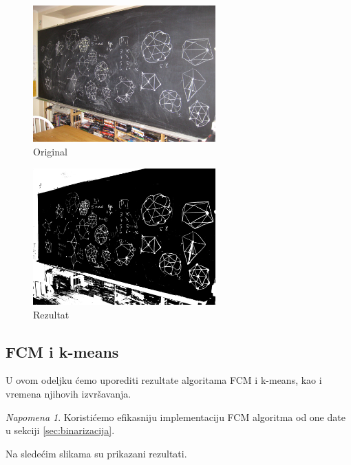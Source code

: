 \documentclass[12pt,a4paper]{article}
\theoremstyle{definition}
\theoremstyle{remark}
\newtheorem{no}{Napomena}[section]
\theoremstyle{plain}
\begin{document}
\begin{multicols}{2}
\begin{figure}[H]
\centering
\includegraphics[width=7cm]{images/blackboard.jpg}
  \caption{Original}\label{blackboard_input}
\end{figure}
\columnbreak
\begin{figure}[H]
\centering
\includegraphics[width=7cm]{images/blackboard_binarized_fcm.png}
  \caption{Rezultat}
\end{figure}
\end{multicols}

\subsection{FCM i k-means}
U ovom odeljku \' cemo uporediti rezultate algoritama FCM i k-means, kao i vremena njihovih izvr\v savanja.

\begin{no}
  Koristi\' cemo efikasniju implementaciju FCM algoritma od one date u sekciji \ref{sec:binarizacija}.
\end{no}

Na slede\' cim slikama su prikazani rezultati.
\end{document}
